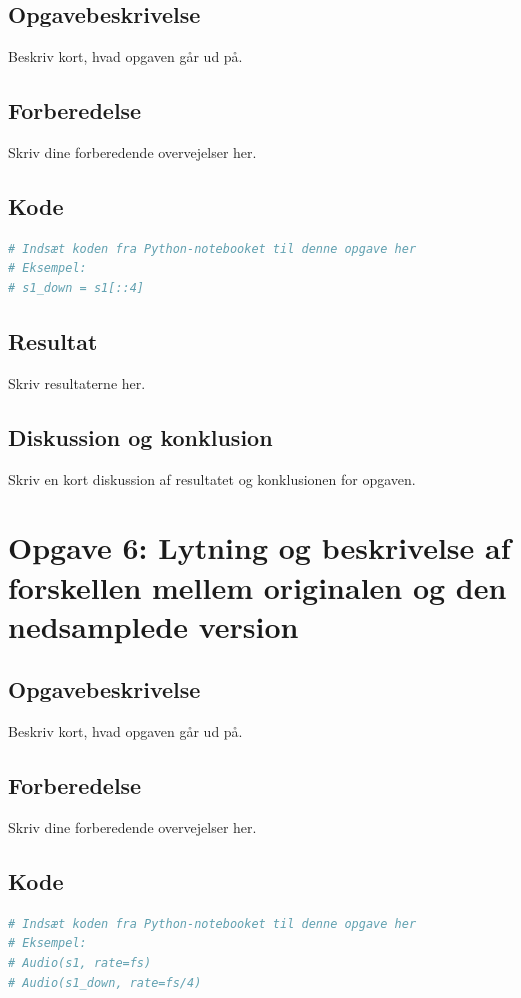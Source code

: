 ﻿\documentclass[11pt,a4paper]{report}
\begin{document}
\subsection{Opgavebeskrivelse}
Beskriv kort, hvad opgaven går ud på.

\subsection{Forberedelse}
Skriv dine forberedende overvejelser her.

\subsection{Kode}
\begin{lstlisting}[language=Python]
# Indsæt koden fra Python-notebooket til denne opgave her
# Eksempel:
# s1_down = s1[::4]
\end{lstlisting}

\subsection{Resultat}
Skriv resultaterne her.

\subsection{Diskussion og konklusion}
Skriv en kort diskussion af resultatet og konklusionen for opgaven.

\newpage

\section{Opgave 6: Lytning og beskrivelse af forskellen mellem originalen og den nedsamplede version}
\subsection{Opgavebeskrivelse}
Beskriv kort, hvad opgaven går ud på.

\subsection{Forberedelse}
Skriv dine forberedende overvejelser her.

\subsection{Kode}
\begin{lstlisting}[language=Python]
# Indsæt koden fra Python-notebooket til denne opgave her
# Eksempel:
# Audio(s1, rate=fs)
# Audio(s1_down, rate=fs/4)
\end{lstlisting}
\end{document}
